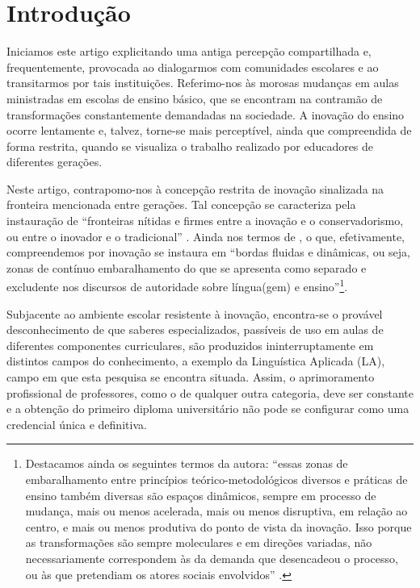
\section{Introdução}\label{sec-introdução}
Iniciamos este artigo explicitando uma antiga percepção compartilhada e,
frequentemente, provocada ao dialogarmos com comunidades escolares e ao
transitarmos por tais instituições. Referimo-nos às morosas mudanças em
aulas ministradas em escolas de ensino básico, que se encontram na
contramão de transformações constantemente demandadas na sociedade. A
inovação do ensino ocorre lentamente e, talvez, torne-se mais
perceptível, ainda que compreendida de forma restrita, quando se
visualiza o trabalho realizado por educadores de diferentes gerações.

Neste artigo, contrapomo-nos à concepção restrita de inovação sinalizada
na fronteira mencionada entre gerações. Tal concepção se caracteriza
pela instauração de ``fronteiras nítidas e firmes entre a inovação e o
conservadorismo, ou entre o inovador e o tradicional'' \cite[p. 8]{signorini_apresentacao_2007}. Ainda nos termos de \textcite[p. 8]{signorini_apresentacao_2007}, o que, efetivamente,
compreendemos por inovação se instaura em ``bordas fluidas e dinâmicas,
ou seja, zonas de contínuo embaralhamento do que
\label{anchor-2}{}se apresenta como separado e excludente
nos discursos de autoridade sobre língua(gem) e ensino''\footnote{
	\label{anchor-3}{}Destacamos ainda os seguintes termos
	da autora: ``essas zonas de embaralhamento entre princípios
	teórico-metodológicos diversos e práticas de ensino também diversas
	são espaços dinâmicos, sempre em processo de mudança, mais ou menos
	acelerada, mais ou menos disruptiva, em relação ao centro, e mais ou
	menos produtiva do ponto de vista da inovação. Isso porque as
	transformações são sempre moleculares e em direções variadas, não
	necessariamente correspondem às da demanda que desencadeou o processo,
	ou às que pretendiam os atores sociais envolvidos'' \cite[p. 8]{signorini_apresentacao_2007}.}.



Subjacente ao ambiente escolar resistente à inovação, encontra-se o
provável desconhecimento de que saberes especializados, passíveis de uso
em aulas de diferentes componentes curriculares, são produzidos
ininterruptamente em distintos campos do conhecimento, a exemplo da
Linguística Aplicada (LA), campo em que esta pesquisa se encontra
situada. Assim, o aprimoramento profissional de professores, como o de
qualquer outra categoria, deve ser constante e a obtenção do primeiro
diploma universitário não pode se configurar como uma credencial única e
definitiva.

